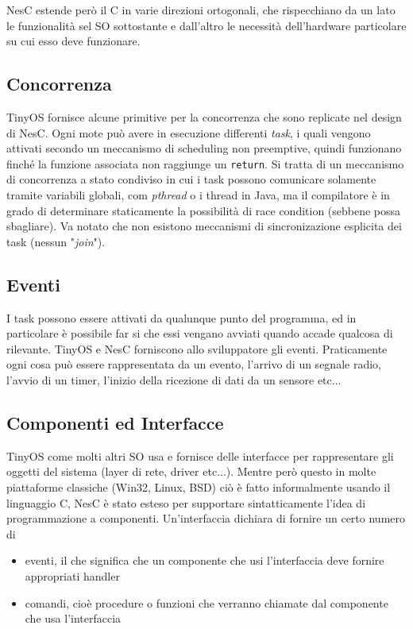 \documentclass[pdftex,12pt,a4paper,italian,openany]{book}
\begin{document}
NesC estende però il C in varie direzioni ortogonali, che rispecchiano da un lato le funzionalità
sel SO sottostante e dall'altro le necessità dell'hardware particolare su cui esso deve funzionare. 

\subsection{Concorrenza}
TinyOS fornisce alcune primitive per la concorrenza che sono replicate nel design di NesC.
Ogni mote può avere in esecuzione differenti \emph{task}, i quali vengono attivati secondo un 
meccanismo di scheduling non preemptive, quindi funzionano finché la funzione associata non 
raggiunge un \texttt{return}. Si tratta di un meccanismo di concorrenza a stato condiviso in cui 
i task possono comunicare solamente tramite variabili globali, com \emph{pthread} o i thread in 
Java, ma il compilatore è in grado di determinare staticamente la possibilità di race condition 
(sebbene possa sbagliare). Va notato che non esistono meccanismi di sincronizazione esplicita 
dei task (nessun "\emph{join}").

\subsection{Eventi}
I task possono essere attivati da qualunque punto del programma, ed in particolare è possibile 
far si che essi vengano avviati quando accade qualcosa di rilevante. 
TinyOS e NesC forniscono allo sviluppatore gli eventi. Praticamente ogni cosa può essere 
rappresentata da un evento, l'arrivo di un segnale radio, l'avvio di un timer, l'inizio della ricezione di dati da un sensore etc...
 

\subsection{Componenti ed Interfacce}
TinyOS come molti altri SO usa e fornisce delle interfacce per rappresentare gli oggetti del 
sistema (layer di rete, driver etc...). 
Mentre però questo in molte piattaforme classiche (Win32, Linux, BSD) ciò è fatto informalmente 
usando il linguaggio C, NesC è stato esteso per supportare sintatticamente l'idea di 
programmazione a componenti. 
Un'interfaccia dichiara di fornire un certo numero di 
\begin{itemize}

\item{eventi, il che significa che un componente che usi l'interfaccia deve fornire appropriati
handler} 

\item{comandi, cioè procedure o funzioni che verranno chiamate dal componente che usa l'interfaccia}
\end{itemize}
\end{document}
